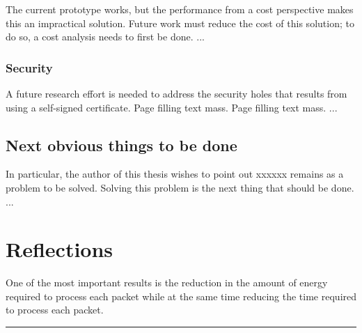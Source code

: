 

The current prototype works, but the performance from a cost perspective makes this an impractical solution. Future work must reduce the cost of this solution; to do so, a cost analysis needs to first be done. ...


\subsubsection{Security}




A future research effort is needed to address the security holes that results from using a self-signed certificate. Page filling text mass. Page filling text mass. ...


\subsection{Next obvious things to be done}


In particular, the author of this thesis wishes to point out xxxxxx remains as a problem to be solved. Solving this problem is the next thing that should be done. ...


\section{Reflections}
\label{sec:reflections}






One of the most important results is the reduction in the amount of
energy required to process each packet while at the same time reducing the
time required to process each packet.




\noindent\rule{\textwidth}{0.4mm}




\cleardoublepage
